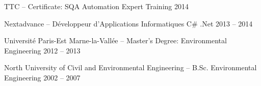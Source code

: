 
\begin{cventries}

  \cventry
    {}
    {TTC -- Certificate: SQA Automation Expert Training}
    {}
    {2014}
    {}

  \cventry
    {}
    {Nextadvance -- Développeur d'Applications Informatiques C\# .Net}
    {}
    {2013 -- 2014}
    {}

  \cventry
    {}
    {Université Paris-Est Marne-la-Vallée -- Master's Degree: Environmental Engineering}
    {}
    {2012 -- 2013}
    {}

  \cventry
    {}
    {North University of Civil and Environmental Engineering -- B.Sc. Environmental Engineering}
    {}
    {2002 -- 2007}
    {}

\end{cventries}

